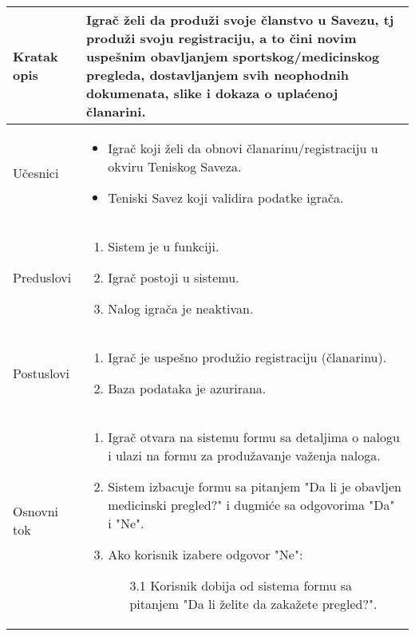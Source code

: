 \documentclass{article}
\begin{document}
       \begin{longtable}{| p{} | p{} |} 
            \hline
                Kratak opis & Igrač želi da produži svoje članstvo u Savezu, tj produži svoju registraciju, a to čini novim uspešnim obavljanjem sportskog/medicinskog pregleda, dostavljanjem svih neophodnih dokumenata, slike i dokaza o uplaćenoj članarini.\\ 
            \hline    
                Učesnici & \begin{itemize}
                    \item Igrač koji želi da obnovi članarinu/registraciju u okviru Teniskog Saveza.
                    \item Teniski Savez koji validira podatke igrača.
                \end{itemize} \\
            \hline
               Preduslovi & \begin{enumerate}
                   \item Sistem je u funkciji.
                   \item Igrač postoji u sistemu.
                   \item Nalog igrača je neaktivan.
               \end{enumerate}\\
            \hline  
                Postuslovi & \begin{enumerate}
                    \item Igrač je uspešno produžio registraciju (članarinu).
                    \item Baza podataka je azurirana.
                \end{enumerate}\\
            \hline
                Osnovni tok & \begin{enumerate}
                    \item Igrač otvara na sistemu formu sa detaljima o nalogu i ulazi na formu za produžavanje važenja naloga.
                    \item Sistem izbacuje formu sa pitanjem "Da li je obavljen medicinski pregled?" i dugmiće sa odgovorima "Da" i "Ne".
                    \item Ako korisnik izabere odgovor "Ne":
                    \begin{enumerate}
                        \item[3.1] Korisnik dobija od sistema formu sa pitanjem "Da li želite da zakažete pregled?".

\end{enumerate}
\end{enumerate}
\end{longtable}
\end{document}
